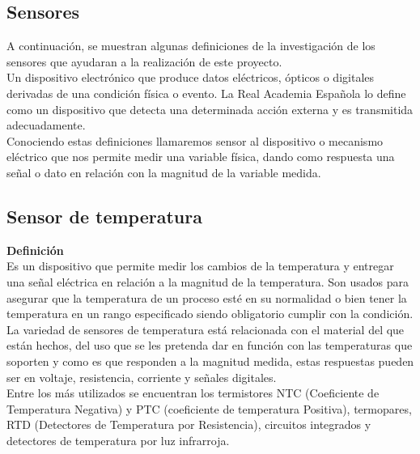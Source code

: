 \begin{enumerate}
\end{enumerate}

\subsection{Sensores}

A continuación, se muestran algunas definiciones de la investigación de los sensores que ayudaran a la realización de este proyecto. \\

Un dispositivo electrónico que produce datos eléctricos, ópticos o digitales derivadas de una condición física o evento. La Real Academia Española lo define como un dispositivo que detecta una determinada acción externa y es transmitida adecuadamente. \\

Conociendo estas definiciones llamaremos sensor al dispositivo o mecanismo eléctrico que nos permite medir una variable física, dando como respuesta una señal o dato en relación con la magnitud de la variable medida. 

\subsection{Sensor de temperatura}

\textbf{Definición} \\

Es un dispositivo que permite medir los cambios de la temperatura y entregar una señal eléctrica en relación a la magnitud de la temperatura. Son usados para asegurar que la temperatura de un proceso esté en su normalidad o bien tener la temperatura en un rango especificado siendo obligatorio cumplir con la condición. \\

La variedad de sensores de temperatura está relacionada con el material del que están hechos, del uso que se les pretenda dar en función con las temperaturas que soporten y como es que responden a la magnitud medida, estas respuestas pueden ser en voltaje, resistencia, corriente y señales digitales. \\

Entre los más utilizados se encuentran los termistores NTC (Coeficiente de Temperatura Negativa) y PTC (coeficiente de temperatura Positiva), termopares, RTD (Detectores de Temperatura por Resistencia), circuitos integrados y detectores de temperatura por luz infrarroja. \\


